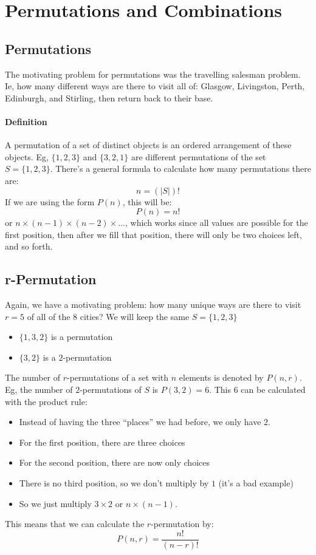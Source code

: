\section{Permutations and Combinations}\label{sec:permutations_and_combinations}

\subsection{Permutations}\label{sub:permutations}

The motivating problem for permutations was the travelling salesman problem.
Ie, how many different ways are there to visit all of: Glasgow, Livingston, Perth, Edinburgh, and Stirling, then return back to their base.

\paragraph{Definition}\label{par:definition}

A permutation of a set of distinct objects is an ordered arrangement of these objects.
Eg, \(\{1,2,3\}\) and \(\{3,2,1\}\) are different permutations of the set \(S=\{1,2,3\}\).
There's a general formula to calculate how many permutations there are:
\[
    n = (|S|)!
\]
If we are using the form \(P(n)\), this will be:
\[
    P(n) = n!
\]
or \(n\times (n-1) \times (n-2) \times ...\), which works since all values are possible for the first position, then after we fill that position, there will only be two choices left, and so forth.

\subsection{r-Permutation}\label{sub:r_permutation}

Again, we have a motivating problem: how many unique ways are there to visit \(r=5\) of all of the \(8\) cities?
We will keep the same \(S=\{1,2,3\}\)
\begin{itemize}
    \item \(\{1,3,2\}\) is a permutation
    \item \(\{3,2\}\) is a \(2\)-permutation
\end{itemize}
The number of \(r\)-permutations of a set with \(n\) elements is denoted by \(P(n,r)\).
Eg, the number of \(2\)-permutations of \(S\) is \(P(3,2)=6\).
This \(6\) can be calculated with the product rule:
\begin{itemize}
    \item Instead of having the three ``places'' we had before, we only have \(2\).
    \item For the first position, there are three choices
    \item For the second position, there are now only choices
    \item There is no third position, so we don't multiply by \(1\) (it's a bad example)
    \item So we just multiply \(3\times 2\) or \(n\times (n-1)\).
\end{itemize}
This means that we can calculate the \(r\)-permutation by:
\[
    P(n,r) = \frac{n!}{(n-r)!}
\]

